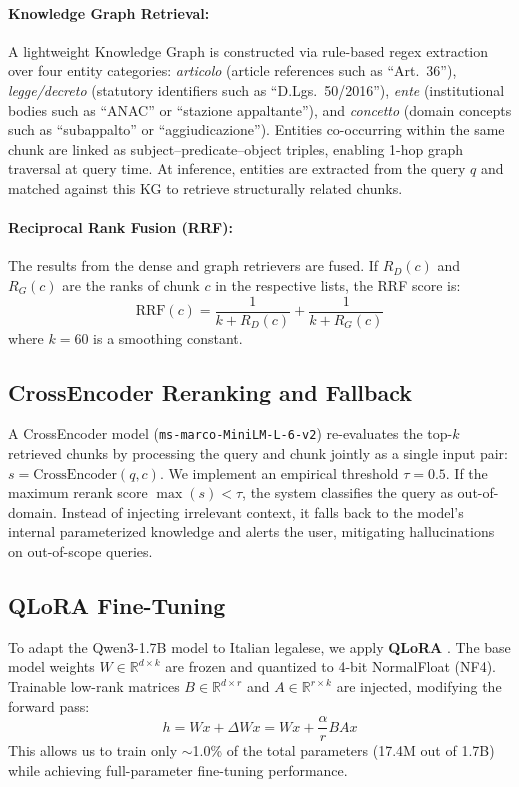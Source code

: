 \documentclass[11pt,a4paper]{article}
\begin{document}
\paragraph{Knowledge Graph Retrieval:} A lightweight Knowledge Graph is constructed via rule-based regex extraction over four entity categories: \textit{articolo} (article references such as ``Art.\ 36''), \textit{legge/decreto} (statutory identifiers such as ``D.Lgs.\ 50/2016''), \textit{ente} (institutional bodies such as ``ANAC'' or ``stazione appaltante''), and \textit{concetto} (domain concepts such as ``subappalto'' or ``aggiudicazione''). Entities co-occurring within the same chunk are linked as subject--predicate--object triples, enabling 1-hop graph traversal at query time. At inference, entities are extracted from the query $q$ and matched against this KG to retrieve structurally related chunks.
\paragraph{Reciprocal Rank Fusion (RRF):} The results from the dense and graph retrievers are fused. If $R_D(c)$ and $R_G(c)$ are the ranks of chunk $c$ in the respective lists, the RRF score \cite{cormack2009reciprocal} is:
\begin{equation}
\text{RRF}(c) = \frac{1}{k + R_D(c)} + \frac{1}{k + R_G(c)}
\end{equation}
where $k=60$ is a smoothing constant.

\subsection{CrossEncoder Reranking and Fallback}
A CrossEncoder model (\texttt{ms-marco-MiniLM-L-6-v2}) re-evaluates the top-$k$ retrieved chunks by processing the query and chunk jointly as a single input pair: $s = \text{CrossEncoder}(q, c)$.
We implement an empirical threshold $\tau = 0.5$. If the maximum rerank score $\max(s) < \tau$, the system classifies the query as out-of-domain. Instead of injecting irrelevant context, it falls back to the model's internal parameterized knowledge and alerts the user, mitigating hallucinations on out-of-scope queries.
\subsection{QLoRA Fine-Tuning}
To adapt the Qwen3-1.7B model to Italian legalese, we apply \textbf{QLoRA} \cite{dettmers2023qlora}. The base model weights $W \in \mathbb{R}^{d \times k}$ are frozen and quantized to 4-bit NormalFloat (NF4). Trainable low-rank matrices $B \in \mathbb{R}^{d \times r}$ and $A \in \mathbb{R}^{r \times k}$ are injected, modifying the forward pass:
\begin{equation}
h = Wx + \Delta Wx = Wx + \frac{\alpha}{r} BAx
\end{equation}
This allows us to train only $\sim$1.0\% of the total parameters (17.4M out of 1.7B) while achieving full-parameter fine-tuning performance.
\end{document}
